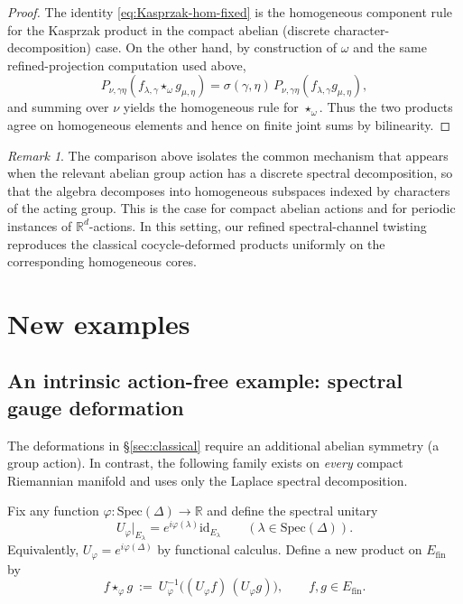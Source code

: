 \documentclass[11pt]{amsart}
\theoremstyle{plain}
\theoremstyle{definition}
\theoremstyle{remark}
\newtheorem{remark}[theorem]{Remark}
\newcommand{\Spec}{\mathrm{Spec}}
\newcommand{\id}{\mathrm{id}}
\newcommand{\bbR}{\mathbb{R}}
\begin{document}
\begin{proof}
The identity \eqref{eq:Kasprzak-hom-fixed} is the homogeneous component rule for the Kasprzak product in the compact abelian (discrete character-decomposition) case.
On the other hand, by construction of $\omega$ and the same refined-projection computation used above,
\[
P_{\nu,\gamma\eta}(f_{\lambda,\gamma}\star_\omega g_{\mu,\eta})
=\sigma(\gamma,\eta)\,P_{\nu,\gamma\eta}(f_{\lambda,\gamma}g_{\mu,\eta}),
\]
and summing over $\nu$ yields the homogeneous rule for $\star_\omega$.
Thus the two products agree on homogeneous elements and hence on finite joint sums by bilinearity.
\end{proof}

\begin{remark}
The comparison above isolates the common mechanism that appears when the relevant abelian group action has a discrete spectral decomposition, so that the algebra decomposes into homogeneous subspaces indexed by characters of the acting group.  This is the case for compact abelian actions and for periodic instances of $\bbR^d$-actions.  In this setting, our refined spectral-channel twisting reproduces the classical cocycle-deformed products uniformly on the corresponding homogeneous cores.
\end{remark}

\section{New examples}

\subsection{An intrinsic action-free example: spectral gauge deformation}\label{subsec:intrinsic-gauge-example}

The deformations in \S\ref{sec:classical} require an additional abelian symmetry (a group action).
In contrast, the following family exists on \emph{every} compact Riemannian manifold and uses only the Laplace spectral decomposition.

Fix any function $\varphi:\Spec(\Delta)\to\bbR$ and define the spectral unitary
\[
U_\varphi\big|_{E_\lambda} = e^{i\varphi(\lambda)}\id_{E_\lambda}\qquad(\lambda\in\Spec(\Delta)).
\]
Equivalently, $U_\varphi = e^{i\varphi(\Delta)}$ by functional calculus.
Define a new product on $E_{\mathrm{fin}}$ by
\begin{equation}\label{eq:gauge-example-product}
f\star_\varphi g \ :=\ U_\varphi^{-1}\big((U_\varphi f)\,(U_\varphi g)\big),\qquad f,g\in E_{\mathrm{fin}}.
\end{equation}
\end{document}
